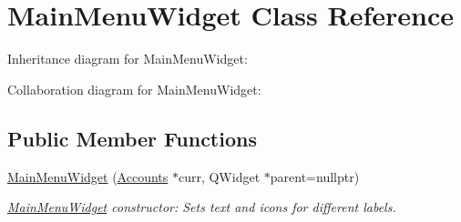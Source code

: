 \hypertarget{classMainMenuWidget}{}\section{Main\+Menu\+Widget Class Reference}
\label{classMainMenuWidget}


Inheritance diagram for Main\+Menu\+Widget\+:


Collaboration diagram for Main\+Menu\+Widget\+:
\subsection*{Public Member Functions}
\begin{DoxyCompactItemize}
\item 
\hyperlink{classMainMenuWidget_abedbc5ac35ef230d4cbcd5ebcffaa780}{Main\+Menu\+Widget} (\hyperlink{classAccounts}{Accounts} $\ast$curr, Q\+Widget $\ast$parent=nullptr)
\begin{DoxyCompactList}\small\item\em \hyperlink{classMainMenuWidget}{Main\+Menu\+Widget} constructor\+: Sets text and icons for different labels. \end{DoxyCompactList}\end{DoxyCompactItemize}

